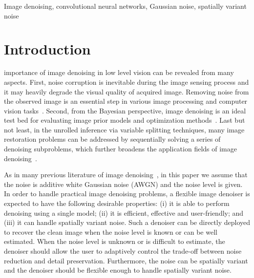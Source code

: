 \documentclass[journal]{IEEEtran}
\begin{document}
\begin{IEEEkeywords}
Image denoising, convolutional neural networks, Gaussian noise, spatially variant noise
\end{IEEEkeywords}



\IEEEpeerreviewmaketitle



\section{Introduction}

 importance of image denoising in low level vision can be revealed from many aspects.
First, noise corruption is inevitable during the image sensing process and it may heavily degrade the visual quality of acquired image. Removing noise from the observed image is an essential step in various image processing and computer vision tasks~\cite{andrews1977digital,chatterjee2010denoising}.
Second, from the Bayesian perspective, image denoising is an ideal test bed for evaluating image prior models and optimization methods~\cite{roth2005fields,zoran2011learning,gu2014weighted}.
Last but not least, in the unrolled inference via variable splitting techniques, many image restoration problems can be addressed by sequentially solving a series of denoising subproblems, which further broadens the application fields of image denoising~\cite{afonso2010fast,heide2014flexisp,romano2016little,zhang2017learning}.


As in many previous literature of image denoising~\cite{portilla2003image,dabov2007image,mairal2009non,dong2013nonlocally}, in this paper we assume that the noise is additive white Gaussian noise (AWGN) and the noise level is given. In order to handle practical image denoising problems, a flexible image denoiser is expected to have the following desirable properties: (i) it is able to perform denoising using a single model; (ii) it is efficient, effective and user-friendly; and (iii) it can handle spatially variant noise. Such a denoiser can be directly deployed to recover the clean image when the noise level is known or can be well estimated. When the noise level is unknown or is difficult to estimate, the denoiser should allow the user to adaptively control the trade-off between noise reduction and detail preservation. Furthermore, the noise can be spatially variant and the denoiser should be flexible enough to handle spatially variant noise.
\end{document}
